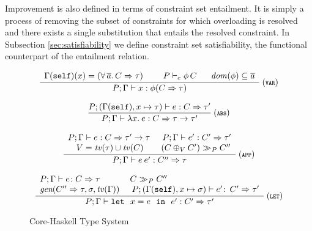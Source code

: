 Improvement is also defined in terms of constraint set entailment.  It
is simply a process of removing the subset of constraints for which
overloading is resolved and there exists a single substitution that
entails the resolved constraint. In Subsection
\ref{sec:satisfiability} we define constraint set satisfiability, the
functional counterpart of the entailment relation.


\begin{figure}
\[ \begin{array}{cc}
      \displaystyle\frac
        {\begin{array}[t]{lll}
           \Gamma(\self)(x) = (\forall\,\overline{a}.\,C\Rightarrow \tau)\:\:\: & \:\:\:P \entail \phi\,C 
           & \:\:\:\ddom(\phi) \subseteq \overline{a}
         \end{array}}
        {P;\Gamma \vdash x: \phi (C \Rightarrow \tau)} \:(\VAR) \\ \\

	\displaystyle\frac
          {P;(\Gamma(\self),x \mapsto \tau) \vdash e: C \Rightarrow \tau'}
	  {P;\Gamma \vdash \lambda x.\:e: C\Rightarrow \tau \rightarrow \tau'} \:(\ABS)  \\ \\

	\displaystyle\frac
	  {\begin{array}[t]{cc}
             P;\Gamma \vdash e: C \Rightarrow \tau' \rightarrow \tau\: &\:
             P;\Gamma \vdash e': C' \Rightarrow \tau' \\
             V = \tv(\tau) \cup \tv(C) & (C \oplus_V C') \simplifies{P} C''
        \end{array}}
	{P;\Gamma \vdash e\:e': C'' \Rightarrow \tau} \:(\APP) \\ \\

	\displaystyle\frac
	 {\begin{array}{ll}
            P;\Gamma \vdash e\!:C \Rightarrow \tau & C \simplifies{P} C'' \\
            \gen(C'' \Rightarrow \tau,\sigma,\tv(\Gamma))\: & \:P;(\Gamma(\self),x \mapsto\sigma) \vdash e'\!:\,C' \Rightarrow \tau'
          \end{array}}
	 {P;\Gamma \vdash \mlet\ x=e\ \iin\ e': C' \Rightarrow\tau' } \:(\LET)
\end{array} \]
\caption{Core-Haskell Type System} 
\label{fig:core-haskell-type-system}
\end{figure}

